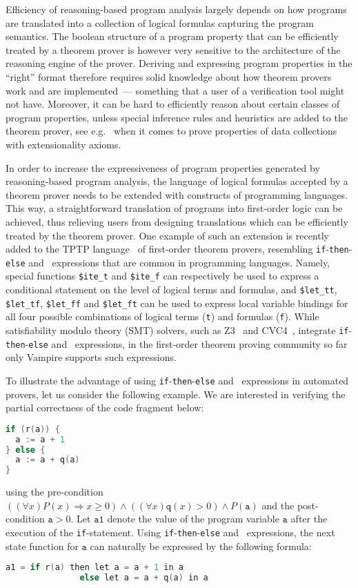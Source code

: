 Efficiency of reasoning-based program analysis largely depends on how programs are translated into a collection of logical formulas capturing the program semantics. The boolean structure of a program property that can be efficiently treated by a theorem prover is however very sensitive to the architecture of the reasoning engine of the prover. Deriving and expressing program properties in the ``right'' format therefore requires solid knowledge about how theorem provers work and are implemented~--- something that a user of a verification tool might not have. Moreover, it can be hard to efficiently reason about certain classes of program properties, unless special inference rules and heuristics are added to the theorem prover, see e.g.~\cite{ATVA14} when it comes to prove properties of data collections with extensionality axioms.

In order to increase the expressiveness of program properties generated by reasoning-based program analysis, the language of logical formulas accepted by a theorem prover needs to be extended with constructs of programming languages. This way, a straightforward translation of programs into first-order logic can be achieved, thus relieving users from designing translations which can be efficiently treated by the theorem prover.
One example of such an extension is recently added to the TPTP language~\cite{TPTP} of first-order theorem provers, resembling \verb'if'-\verb'then'-\verb'else' and \LETIN\ expressions that are common in programming languages. Namely, special functions \verb'$ite_t' and \verb'$ite_f' can respectively be used to express a conditional statement on the level of logical terms and formulas, and \verb'$let_tt', \verb'$let_tf', \verb'$let_ff' and \texttt{\$let\_ft} can be used to express local variable bindings for all four possible combinations of logical terms (\verb't') and formulas (\verb'f'). While satisfiability modulo theory (SMT) solvers, such as Z3~\cite{Z3} and CVC4~\cite{CVC4}, integrate \verb'if'-\verb'then'-\verb'else' and \LETIN\ expressions, in the first-order theorem proving community so far only Vampire supports such expressions.

To illustrate the advantage of using \verb'if'-\verb'then'-\verb'else' and \LETIN\ expressions in automated provers, let us consider the following example. We are interested in verifying the partial correctness of the code fragment below:
\begin{lstlisting}[language=cpp]
if (r(a)) {
  a := a + 1
} else {
  a := a + q(a)
}
\end{lstlisting}
using the pre-condition $((\forall x) P(x) \Rightarrow x \ge 0) \wedge ((\forall x) \mathtt{q}(x) > 0) \wedge P(\mathtt{a})$ and the post-condition $\mathtt{a} > 0$.
Let $\mathtt{a1}$ denote the value of the program variable $\mathtt{a}$ after the execution of the \verb'if'-statement. Using \verb'if'-\verb'then'-\verb'else' and \LETIN\ expressions, the next state function for $\mathtt{a}$ can naturally be expressed by the following formula:
\begin{lstlisting}[language=cpp]
a1 = if r(a) then let a = a + 1 in a
               else let a = a + q(a) in a
\end{lstlisting}

